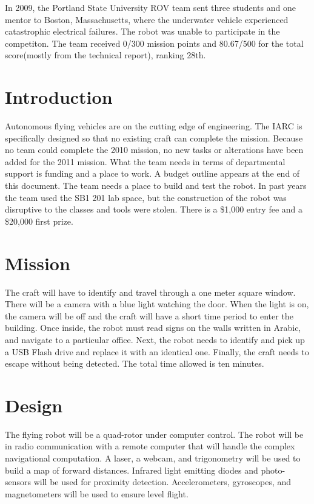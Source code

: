 \documentclass{article}
\begin{document}
In 2009, the Portland State University ROV team sent three students and one mentor to Boston, Massachusetts, where the underwater vehicle experienced catastrophic electrical failures. The robot was unable to participate in the competiton. The team received 0/300 mission points and 80.67/500 for the total score(mostly from the technical report), ranking 28th. 


\section{Introduction}

Autonomous flying vehicles are on the cutting edge of engineering. The IARC is specifically designed so that no existing craft can complete the mission. Because no team could complete the 2010 mission, no new tasks or alterations have been added for the 2011 mission. What the team needs in terms of departmental support is funding and a place to work. A budget outline appears at the end of this document. The team needs a place to build and test the robot. In past years the team used the SB1 201 lab space, but the construction of the robot was disruptive to the classes and tools were stolen. There is a \$1,000 entry fee and a \$20,000 first prize.

\section{Mission}

The craft will have to identify and travel through a one meter square window. There will be a camera with a blue light watching the door. When the light is on, the camera will be off and the craft will have a short time period to enter the building. Once inside, the robot must read signs on the walls written in Arabic, and navigate to a particular office. Next, the robot needs to identify and pick up a USB Flash drive and replace it with an identical one. Finally, the craft needs to escape without being detected. The total time allowed is ten minutes. 
\section{Design}

The flying robot will be a quad-rotor under computer control. The robot will be in radio communication with a remote computer that will handle the complex navigational computation. A laser, a webcam, and trigonometry will be used to build a map of forward distances. Infrared light emitting diodes and photo-sensors will be used for proximity detection. Accelerometers, gyroscopes, and magnetometers will be used to ensure level flight. 
\end{document}
